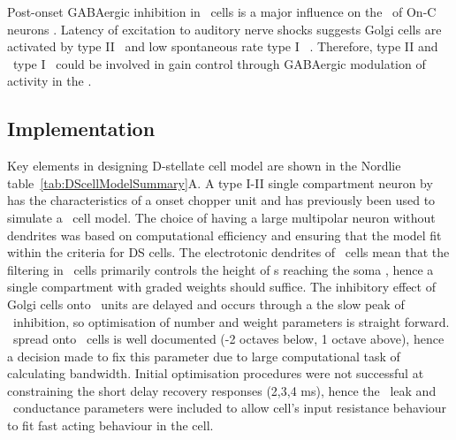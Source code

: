 \smallskip{}

Post-onset GABAergic inhibition in \DS~cells is a major influence on the
\PSTH~of On-C neurons \citep{FerragamoGoldingEtAl:1998a,EvansZhao:1998}. Latency
of excitation to auditory nerve shocks suggests Golgi cells are activated by
type II \ANFs~and low spontaneous rate type I
\ANFs~\citep{BensonBerglundEtAl:1996, FerragamoGoldingEtAl:1998}. Therefore,
type II and \LSR~type I \ANFs~could be involved in gain control through
GABAergic modulation of activity in the \VCN\@.

\smallskip{}





\subsection{Implementation}\label{sec:DS:implementation}
 

Key elements in designing D-stellate cell model are shown in the
Nordlie table~\ref{tab:DScellModelSummary}A. A type I-II single
compartment neuron by \citet{RothmanManis:2003b} has the
characteristics of a onset chopper unit and has previously been used
to simulate a \DS~cell model. The choice of having a large multipolar
neuron without dendrites was based on computational efficiency and
ensuring that the model fit within the criteria for DS cells. The
electrotonic dendrites of \DS~cells mean that the filtering in
\DS~cells primarily controls the height of {\EPSP}s reaching the soma
\citep{WhiteYoungEtAl:1994}, hence a single compartment with graded
weights should suffice. The inhibitory effect of Golgi cells onto
\DS~units are delayed and occurs through a the slow peak of
\GABAa~inhibition, so optimisation of number and weight parameters is
straight forward. \ANF~spread onto \DS~cells is well documented (-2
octaves below, 1 octave above), hence a decision made to fix this
parameter due to large computational task of calculating
bandwidth. Initial optimisation procedures were not successful at
constraining the short delay recovery responses (2,3,4 ms), hence the
\DS~leak and \KLT~conductance parameters were included to allow cell's
input resistance behaviour to fit fast acting behaviour in the cell.

